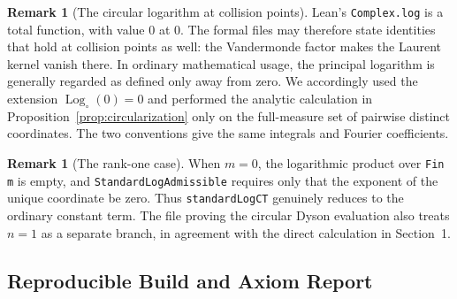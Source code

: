 \documentclass[11pt,a4paper]{article}
\theoremstyle{definition}
\newtheorem{remark}[theorem]{Remark}
\newcommand{\Logc}{\operatorname{Log}_{\circ}}
\begin{document}
\begin{remark}[The circular logarithm at collision points]
Lean's \texttt{Complex.log} is a total function, with value $0$ at
$0$.  The formal files may therefore state identities that hold at
collision points as well: the Vandermonde factor makes the Laurent
kernel vanish there.  In ordinary mathematical usage, the principal
logarithm is generally regarded as defined only away from zero.  We
accordingly used the extension $\Logc(0)=0$ and performed the analytic
calculation in Proposition~\ref{prop:circularization} only on the
full-measure set of pairwise distinct coordinates.  The two conventions
give the same integrals and Fourier coefficients.
\end{remark}

\begin{remark}[The rank-one case]
When $m=0$, the logarithmic product over \texttt{Fin m} is empty, and
\texttt{StandardLogAdmissible} requires only that the exponent of the
unique coordinate be zero.  Thus \texttt{standardLogCT} genuinely
reduces to the ordinary constant term.  The file proving the circular
Dyson evaluation also treats $n=1$ as a separate branch, in agreement
with the direct calculation in Section~1.
\end{remark}

\subsection{Reproducible Build and Axiom Report}
\end{document}
